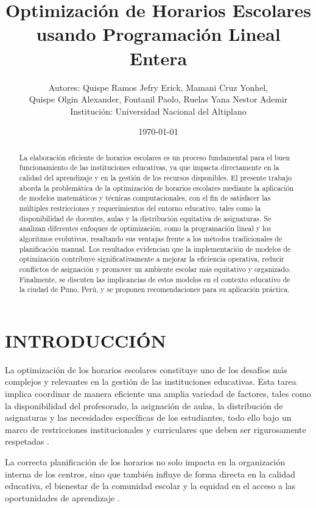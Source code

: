 \documentclass[12pt]{article}
\title{Optimización de Horarios Escolares usando Programación Lineal Entera}
\author{Autores: Quispe Ramos Jefry Erick, Mamani Cruz Yonhel,\\ Quispe Olgin Alexander, Fontanil Paolo, Ruelas Yana Nestor Ademir \\
Institución: Universidad Nacional del Altiplano}
\date{\today}
\begin{document}
\maketitle

\begin{abstract}
La elaboración eficiente de horarios escolares es un proceso fundamental para el buen funcionamiento de las instituciones educativas, ya que impacta directamente en la calidad del aprendizaje y en la gestión de los recursos disponibles. El presente trabajo aborda la problemática de la optimización de horarios escolares mediante la aplicación de modelos matemáticos y técnicas computacionales, con el fin de satisfacer las múltiples restricciones y requerimientos del entorno educativo, tales como la disponibilidad de docentes, aulas y la distribución equitativa de asignaturas. Se analizan diferentes enfoques de optimización, como la programación lineal y los algoritmos evolutivos, resaltando sus ventajas frente a los métodos tradicionales de planificación manual. Los resultados evidencian que la implementación de modelos de optimización contribuye significativamente a mejorar la eficiencia operativa, reducir conflictos de asignación y promover un ambiente escolar más equitativo y organizado. Finalmente, se discuten las implicancias de estos modelos en el contexto educativo de la ciudad de Puno, Perú, y se proponen recomendaciones para su aplicación práctica.
\end{abstract}

\section{INTRODUCCIÓN}

La optimización de los horarios escolares constituye uno de los desafíos más complejos y relevantes en la gestión de las instituciones educativas. Esta tarea implica coordinar de manera eficiente una amplia variedad de factores, tales como la disponibilidad del profesorado, la asignación de aulas, la distribución de asignaturas y las necesidades específicas de los estudiantes, todo ello bajo un marco de restricciones institucionales y curriculares que deben ser rigurosamente respetadas \cite{ref5,ref6}. 

La correcta planificación de los horarios no solo impacta en la organización interna de los centros, sino que también influye de forma directa en la calidad educativa, el bienestar de la comunidad escolar y la equidad en el acceso a las oportunidades de aprendizaje \cite{ref3}.
\end{document}
